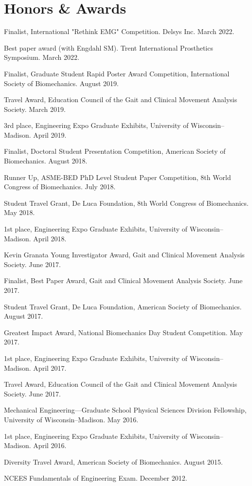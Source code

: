 \documentclass[letterpaper, 10pt]{article}
\begin{document}
\section{Honors \& Awards}

\begin{compactitem}
     \item Finalist, International "Rethink EMG" Competition. Delsys Inc. March 2022.
	\item Best paper award (with Engdahl SM). Trent International Prosthetics Symposium. March 2022.
	\item Finalist, Graduate Student Rapid Poster Award Competition, International Society of Biomechanics. August 2019.
	\item Travel Award, Education Council of the Gait and Clinical Movement Analysis Society. March 2019.
	\item 3rd place, Engineering Expo Graduate Exhibits, University of Wisconsin--Madison. April 2019.
	\item Finalist, Doctoral Student Presentation Competition, American Society of Biomechanics. August 2018.
	\item Runner Up, ASME-BED PhD Level Student Paper Competition, 8th World Congress of Biomechanics. July 2018.
	\item Student Travel Grant, De Luca Foundation, 8th World Congress of Biomechanics. May 2018.
	\item 1st place, Engineering Expo Graduate Exhibits, University of Wisconsin--Madison. April 2018.
	\item Kevin Granata Young Investigator Award, Gait and Clinical Movement Analysis Society. June 2017.
	\item Finalist, Best Paper Award, Gait and Clinical Movement Analysis Society. June 2017.
	\item Student Travel Grant, De Luca Foundation, American Society of Biomechanics. August 2017.
	\item Greatest Impact Award, National Biomechanics Day Student Competition. May 2017.
	\item 1st place, Engineering Expo Graduate Exhibits, University of Wisconsin--Madison. April 2017.
	\item Travel Award, Education Council of the Gait and Clinical Movement Analysis Society. June 2017.
	\item Mechanical Engineering---Graduate School Physical Sciences Division Fellowship, University of Wisconsin--Madison. May 2016.
	\item 1st place, Engineering Expo Graduate Exhibits, University of Wisconsin--Madison. April 2016.
	\item Diversity Travel Award, American Society of Biomechanics. August 2015.
	\item NCEES Fundamentals of Engineering Exam. December 2012.
\end{compactitem}
\end{document}
